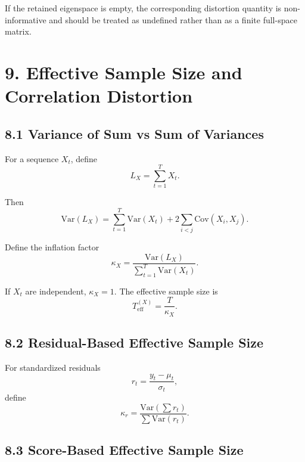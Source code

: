 \documentclass[11pt]{article}
\begin{document}
If the retained eigenspace is empty, the corresponding distortion quantity is non-informative and should be treated as undefined rather than as a finite full-space matrix.

\section*{9. Effective Sample Size and Correlation Distortion}

\subsection*{8.1 Variance of Sum vs Sum of Variances}

For a sequence $X_t$, define
\begin{equation}
L_X = \sum_{t=1}^T X_t.
\end{equation}

Then
\begin{equation}
\mathrm{Var}(L_X)
=
\sum_{t=1}^T \mathrm{Var}(X_t)
+
2\sum_{i<j}\mathrm{Cov}(X_i, X_j).
\end{equation}

Define the inflation factor
\begin{equation}
\kappa_X
=
\frac{\mathrm{Var}(L_X)}
{\sum_{t=1}^T \mathrm{Var}(X_t)}.
\end{equation}

If $X_t$ are independent, $\kappa_X = 1$. The effective sample size is
\begin{equation}
T_{\mathrm{eff}}^{(X)} = \frac{T}{\kappa_X}.
\end{equation}

\subsection*{8.2 Residual-Based Effective Sample Size}

For standardized residuals
\begin{equation}
r_t = \frac{y_t - \mu_t}{\sigma_t},
\end{equation}
define
\begin{equation}
\kappa_r
=
\frac{\mathrm{Var}\!\left(\sum r_t\right)}
{\sum \mathrm{Var}(r_t)}.
\end{equation}

\subsection*{8.3 Score-Based Effective Sample Size}
\end{document}

